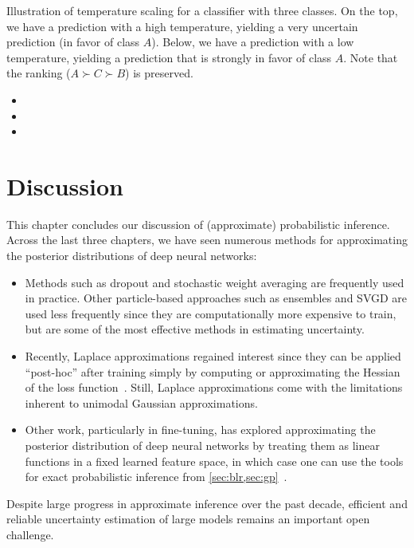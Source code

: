 \begin{marginfigure}
  \caption{Illustration of temperature scaling for a classifier with three classes.
  On the top, we have a prediction with a high temperature, yielding a very uncertain prediction (in favor of class $A$).
  Below, we have a prediction with a low temperature, yielding a prediction that is strongly in favor of class $A$.
  Note that the ranking ($A \succ C \succ B$) is preserved.}
\end{marginfigure}

\begin{oreadings}
  \begin{itemize}
    \item {}
    \item {}
    \item {}
  \end{itemize}
\end{oreadings}

\section*{Discussion}

This chapter concludes our discussion of (approximate) probabilistic inference.
Across the last three chapters, we have seen numerous methods for approximating the posterior distributions of deep neural networks: \begin{itemize}
  \item Methods such as dropout and stochastic weight averaging are frequently used in practice.
  Other particle-based approaches such as ensembles and SVGD are used less frequently since they are computationally more expensive to train, but are some of the most effective methods in estimating uncertainty.

  \item Recently, Laplace approximations regained interest since they can be applied ``post-hoc'' after training simply by computing or approximating the Hessian of the loss function~\citep{daxberger2021laplace,antoran2022adapting}.
  Still, Laplace approximations come with the limitations inherent to unimodal Gaussian approximations.

  \item Other work, particularly in fine-tuning, has explored approximating the posterior distribution of deep neural networks by treating them as linear functions in a fixed learned feature space, in which case one can use the tools for exact probabilistic inference from \cref{sec:blr,sec:gp}~\citep[e.g.,][]{hubotter2025efficiently}.
\end{itemize}
Despite large progress in approximate inference over the past decade, efficient and reliable uncertainty estimation of large models remains an important open challenge.

